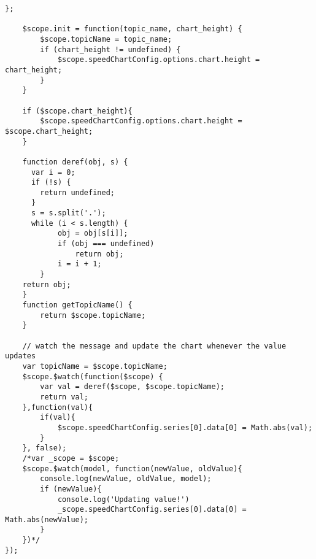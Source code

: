 \begin{lstlisting}[breaklines=true,basicstyle=\tiny]
    };

    $scope.init = function(topic_name, chart_height) {
        $scope.topicName = topic_name;
        if (chart_height != undefined) {
            $scope.speedChartConfig.options.chart.height = chart_height;
        }
    }

    if ($scope.chart_height){
        $scope.speedChartConfig.options.chart.height = $scope.chart_height;
    }

    function deref(obj, s) {
      var i = 0;
      if (!s) {
        return undefined;
      }
      s = s.split('.');
      while (i < s.length) {
            obj = obj[s[i]];
            if (obj === undefined)
                return obj;
            i = i + 1;
        }
    return obj;
    }
    function getTopicName() {
        return $scope.topicName;
    }

    // watch the message and update the chart whenever the value updates
    var topicName = $scope.topicName;
    $scope.$watch(function($scope) {
        var val = deref($scope, $scope.topicName);
        return val;
    },function(val){
        if(val){
            $scope.speedChartConfig.series[0].data[0] = Math.abs(val);
        }
    }, false);
    /*var _scope = $scope;
    $scope.$watch(model, function(newValue, oldValue){
        console.log(newValue, oldValue, model);
        if (newValue){
            console.log('Updating value!')
            _scope.speedChartConfig.series[0].data[0] = Math.abs(newValue);
        }
    })*/
});

\end{lstlisting}


